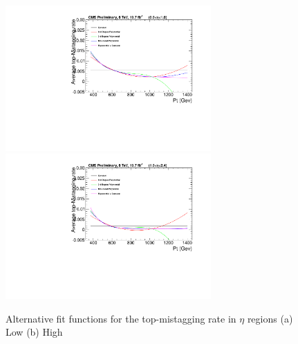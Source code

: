 
\begin{figure}[htcb]
\begin{center}
\includegraphics[width=0.7\textwidth]{AN-14-049/figs/BKGFITCOMPLOGE1.pdf}\\
\includegraphics[width=0.7\textwidth]{AN-14-049/figs/BKGFITCOMPLOGE2.pdf}
\caption{
Alternative fit functions for the top-mistagging rate in $\eta$ regions
(a) Low
(b) High
}
\label{figs:bsBKGFITCOMP}
\end{center}
\end{figure}

